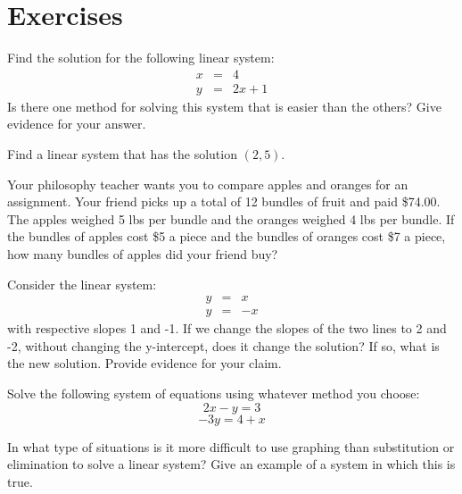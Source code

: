 \section*{Exercises}

\begin{exercise}
	Find the solution for the following linear system:
	$$
	\begin{array}{rcl}
	x & = & 4 \\
	y & = & 2x+1	
	\end{array}
	$$
	Is there one method for solving this system that is easier than the others? Give evidence for your answer. 
\end{exercise}
\bigskip

\begin{exercise}
	Find a linear system that has the solution $(2,5)$.
\end{exercise}
\bigskip

\begin{exercise}
Your philosophy teacher wants you to compare apples and oranges for an assignment. Your friend picks up a total of 12 bundles of fruit and paid \$74.00. The apples weighed 5 lbs per bundle and the oranges weighed 4 lbs per bundle. If the bundles of apples cost \$5 a piece and the bundles of oranges cost \$7 a piece, how many bundles of apples did your friend buy?
\end{exercise}

\begin{exercise}
Consider the linear system:
$$
\begin{array}{rcc}
y& = & x \\
y & = & -x 	
\end{array}
$$
with respective slopes 1 and -1. If we change the slopes of the two lines to 2 and -2, without changing the y-intercept, does it change the solution? If so, what is the new solution. Provide evidence for your claim. 	
\end{exercise}

\bigskip

\begin{exercise}
Solve the following system of equations using whatever method you choose:
$$
2x-y = 3
$$
$$
-3y = 4 +x
$$	
\end{exercise}

\bigskip

\begin{exercise}
	In what type of situations is it more difficult to use graphing than substitution or elimination to solve a linear system? Give an example of a system in which this is true. 
\end{exercise}

